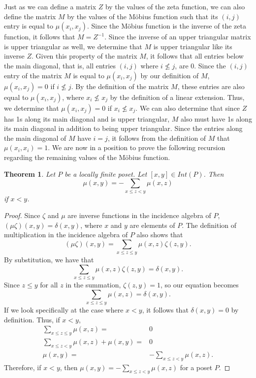 \documentclass{article} %
\theoremstyle{definition}
\theoremstyle{plain}
\newtheorem{thm}{Theorem}[section]
\begin{document}
Just as we can define a matrix $Z$ by the values of the zeta function, we can also define the matrix $M$ by the values of the M\"{o}bius function such that its $(i,j)$ entry is equal to $\mu(x_i,x_j)$. Since the M\"{o}bius function is the inverse of the zeta function, it follows that $M=Z^{-1}$. Since the inverse of an upper triangular matrix is upper triangular as well, we determine that $M$ is upper triangular like its inverse $Z$. Given this property of the matrix $M$, it follows that all entries below the main diagonal, that is, all entries $(i,j)$ where $i \not \leq j$, are 0. Since the $(i,j)$ entry of the matrix $M$ is equal to $\mu(x_i,x_j)$ by our definition of $M$, $\mu(x_i,x_j)=0$ if $i \not \leq j$. By the definition of the matrix $M$, these entries are also equal to $\mu(x_i,x_j)$, where $x_i \not\leq x_j$ by the definition of a linear extension. Thus, we determine that $\mu(x_i,x_j)=0$ if $x_i \not\leq x_j$. We can also determine that since $Z$ has 1s along its main diagonal and is upper triangular, $M$ also must have 1s along its main diagonal in addition to being upper triangular. Since the entries along the main diagonal of $M$ have $i=j$, it follows from the definition of $M$ that $\mu(x_i,x_i)=1$. We are now in a position to prove the following recursion regarding the remaining values of the M\"{o}bius function.

\begin{thm} Let $P$ be a locally finite poset. Let $[x,y] \in Int(P)$. Then
$$\mu(x,y)=-\sum_{x\le z<y}\mu(x,z) $$
if $x < y$.
\end{thm}
\begin{proof} Since $\zeta$ and $\mu$ are inverse functions in the incidence algebra of $P$, $(\mu\zeta)(x,y)=\delta(x,y)$, where $x$ and $y$ are elements of $P$. The definition of multiplication in the incidence algebra of $P$ also shows that
$$(\mu\zeta)(x,y)=\sum_{x\le z\le y}\mu(x,z)\zeta(z,y).$$
By substitution, we have that
$$\sum_{x\le z\le y}\mu(x,z)\zeta(z,y)=\delta(x,y).$$
Since $z \le y$ for all $z$ in the summation, $\zeta(z,y)=1$, so our equation becomes
$$\sum_{x\le z\le y}\mu(x,z)=\delta(x,y).$$
If we look specifically at the case where $x<y$, it follows that $\delta(x,y)=0$ by definition. Thus, if $x<y$,
\begin{align*}
\sum_{x\le z\le y}\mu(x,z)=&0\\
\sum_{x\le z<y}\mu(x,z)+\mu(x,y)=&0\\
\mu(x,y)=&-\sum_{x\le z<y}\mu(x,z).
\end{align*}
Therefore, if $x<y$, then $\mu(x,y)=-\sum_{x\le z<y}\mu(x,z)$ for a
poset $P$.
\end{proof}
\end{document}

